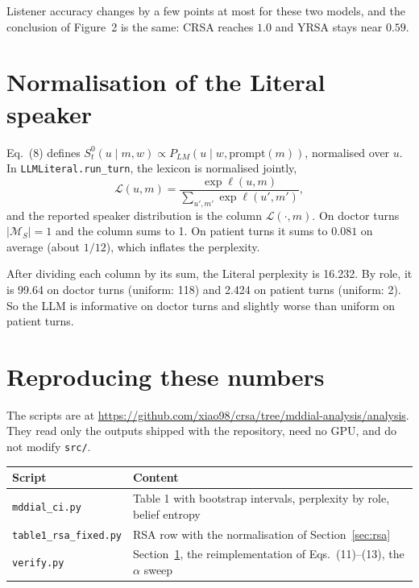 \documentclass[11pt,a4paper]{article}
\newcommand{\code}[1]{\texttt{\small #1}}
\begin{document}
Listener accuracy changes by a few points at most for these two models, and the conclusion of
Figure~2 is the same: CRSA reaches $1.0$ and YRSA stays near $0.59$.

\section{Normalisation of the Literal speaker}
\label{sec:literal}

Eq.~(8) defines $S^0_t(u \mid m, w) \propto P_{LM}(u \mid w, \mathrm{prompt}(m))$, normalised over
$u$. In \code{LLMLiteral.run\_turn}, the lexicon is normalised jointly,
\[
\mathcal{L}(u, m) = \frac{\exp \ell(u, m)}{\sum_{u', m'} \exp \ell(u', m')},
\]
and the reported speaker distribution is the column $\mathcal{L}(\cdot, m)$. On doctor turns
$|\mathcal{M}_S| = 1$ and the column sums to 1. On patient turns it sums to $0.081$ on average
(about $1/12$), which inflates the perplexity.

After dividing each column by its sum, the Literal perplexity is 16.232. By role, it is 99.64 on
doctor turns (uniform: 118) and 2.424 on patient turns (uniform: 2). So the LLM is informative on
doctor turns and slightly worse than uniform on patient turns.

\section{Reproducing these numbers}

The scripts are at \url{https://github.com/xiao98/crsa/tree/mddial-analysis/analysis}. They read
only the outputs shipped with the repository, need no GPU, and do not modify \code{src/}.

\begin{center}
\begin{tabular}{ll}
\toprule
Script & Content \\
\midrule
\code{mddial\_ci.py} & Table 1 with bootstrap intervals, perplexity by role, belief entropy \\
\code{table1\_rsa\_fixed.py} & RSA row with the normalisation of Section~\ref{sec:rsa} \\
\code{verify.py} & Section~\ref{sec:literal}, the reimplementation of Eqs.~(11)--(13), the $\alpha$ sweep \\
\bottomrule
\end{tabular}
\end{center}
\end{document}
